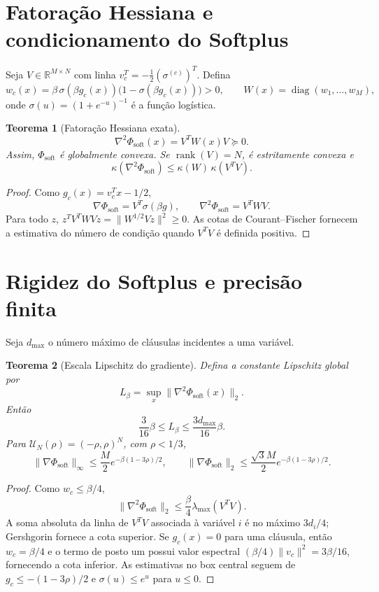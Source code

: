 \documentclass[11pt,a4paper]{article}
\newtheorem{theorem}{Teorema}[section]
\begin{document}
\section{Fatoração Hessiana e condicionamento do Softplus}
Seja $V\in\mathbb R^{M\times N}$ com linha $v_c^T=-\frac12(\sigma^{(c)})^T$. Defina
\[
w_c(x)=\beta\,\sigma(\beta g_c(x))\bigl(1-\sigma(\beta g_c(x))\bigr)>0,
\qquad W(x)=\operatorname{diag}(w_1,\ldots,w_M),
\]
onde $\sigma(u)=(1+e^{-u})^{-1}$ é a função logística.

\begin{theorem}[Fatoração Hessiana exata]
\[
\nabla^2\Phi_{\mathrm{soft}}(x)=V^TW(x)V\succeq0.
\]
Assim, $\Phi_{\mathrm{soft}}$ é globalmente convexa. Se $\operatorname{rank}(V)=N$, é estritamente convexa e
\[
\kappa(\nabla^2\Phi_{\mathrm{soft}})
\le \kappa(W)\,\kappa(V^TV).
\]
\end{theorem}
\begin{proof}
Como $g_c(x)=v_c^Tx-1/2$,
\[
\nabla\Phi_{\mathrm{soft}}=V^T\sigma(\beta g),
\qquad
\nabla^2\Phi_{\mathrm{soft}}=V^TWV.
\]
Para todo $z$, $z^TV^TWVz=\|W^{1/2}Vz\|^2\ge0$. As cotas de Courant--Fischer fornecem a estimativa do número de condição quando $V^TV$ é definida positiva.
\end{proof}

\section{Rigidez do Softplus e precisão finita}
Seja $d_{\max}$ o número máximo de cláusulas incidentes a uma variável.

\begin{theorem}[Escala Lipschitz do gradiente]
Defina a constante Lipschitz global por
\[
L_\beta=\sup_x\|\nabla^2\Phi_{\mathrm{soft}}(x)\|_2.
\]
Então
\[
\frac3{16}\beta\le L_\beta\le\frac{3d_{\max}}{16}\beta.
\]
Para $\mathcal U_N(\rho)=(-\rho,\rho)^N$, com $\rho<1/3$,
\[
\|\nabla\Phi_{\mathrm{soft}}\|_\infty
\le\frac M2e^{-\beta(1-3\rho)/2},
\qquad
\|\nabla\Phi_{\mathrm{soft}}\|_2
\le\frac{\sqrt3M}{2}e^{-\beta(1-3\rho)/2}.
\]
\end{theorem}
\begin{proof}
Como $w_c\le\beta/4$,
\[
\|\nabla^2\Phi_{\mathrm{soft}}\|_2\le\frac\beta4\lambda_{\max}(V^TV).
\]
A soma absoluta da linha de $V^TV$ associada à variável $i$ é no máximo $3d_i/4$; Gershgorin fornece a cota superior. Se $g_c(x)=0$ para uma cláusula, então $w_c=\beta/4$ e o termo de posto um possui valor espectral $(\beta/4)\|v_c\|^2=3\beta/16$, fornecendo a cota inferior. As estimativas no box central seguem de $g_c\le-(1-3\rho)/2$ e $\sigma(u)\le e^u$ para $u\le0$.
\end{proof}
\end{document}
